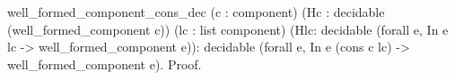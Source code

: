 well_formed_component_cons_dec 
   (c  : component) 
   (Hc : decidable (well_formed_component c))
   (lc : list component) 
   (Hlc: decidable (forall e, In e lc -> well_formed_component e)):
 decidable (forall e, In e (cons c lc) -> well_formed_component e).
Proof.